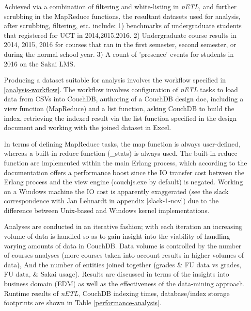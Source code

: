 

Achieved via a combination of filtering and white-listing in \textit{nETL}, and further scrubbing in the MapReduce functions, the resultant datasets used for analysis, after scrubbing, filtering, etc. include: 1) benchmarks of undergraduate students that registered for UCT in 2014,2015,2016. 2) Undergraduate course results in 2014, 2015, 2016 for courses that ran in the first semester, second semester, or during the normal school year. 3) A count of 'presence' events for students in 2016 on the Sakai LMS.

Producing a dataset suitable for analysis involves the workflow specified in \ref{analysis-workflow}. The workflow involves configuration of \textit{nETL} tasks to load data from CSVs into CouchDB, authoring of a CouchDB design doc, including a view function (MapReduce) and a list function, asking CouchDB to build the index, retrieving the indexed result via the list function specified in the design document and working with the joined dataset in Excel.

In terms of defining MapReduce tasks, the map function is always user-defined, whereas a built-in reduce function (\_stats) is always used. The built-in reduce function are implemented within the main Erlang process, which according to the documentation offers a performance boost since the IO transfer cost between the Erlang process and the view engine (couchjs.exe by default) is negated. Working on a Windows machine the IO cost is apparently exaggerated (see the slack correspondence with Jan Lehnardt in appendix \ref{slack-1-nov}) due to the difference between Unix-based and Windows kernel implementations.

Analyses are conducted in an iterative fashion; with each iteration an increasing volume of data is handled so as to gain insight into the viability of handling varying amounts of data in CouchDB. Data volume is controlled by the number of courses analyses (more courses taken into account results in higher volumes of data), And the number of entities joined together (grades \& FU data vs grades, FU data, \& Sakai usage). Results are discussed in terms of the insights into business domain (EDM) as well as the effectiveness of the data-mining approach. Runtime results of \textit{nETL}, CouchDB indexing times, database/index storage footprints are shown in Table \ref{performance-analysis}.

